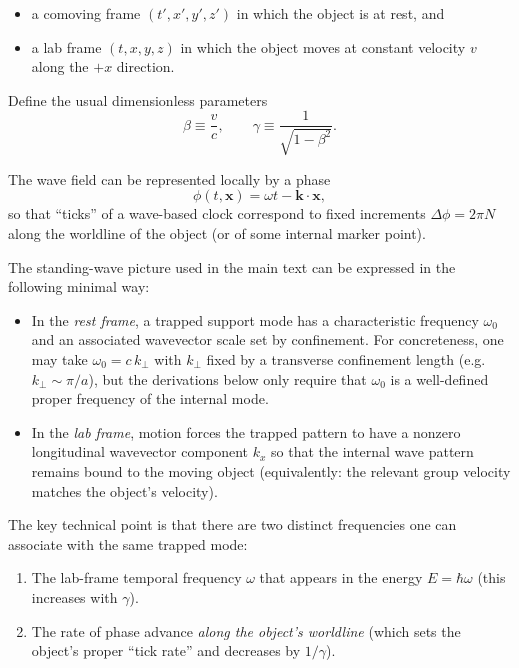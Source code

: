 \documentclass[11pt]{article}
\begin{document}
\begin{itemize}
  \item a comoving frame $(t',x',y',z')$ in which the object is at rest, and
  \item a lab frame $(t,x,y,z)$ in which the object moves at constant velocity
    $v$ along the $+x$ direction.
\end{itemize}

Define the usual dimensionless parameters
\begin{equation}
\beta \equiv \frac{v}{c},
\qquad
\gamma \equiv \frac{1}{\sqrt{1-\beta^2}}.
\label{eq:app_beta_gamma}
\end{equation}

The wave field can be represented locally by a phase
\begin{equation}
\phi(t,\mathbf x) = \omega t - \mathbf k\cdot \mathbf x,
\label{eq:app_phase_def}
\end{equation}
so that ``ticks'' of a wave-based clock correspond to fixed increments
$\Delta\phi = 2\pi N$ along the worldline of the object (or of some internal
marker point).

The standing-wave picture used in the main text can be expressed in the
following minimal way:

\begin{itemize}
\item In the \emph{rest frame}, a trapped support mode has a characteristic
frequency $\omega_0$ and an associated wavevector scale set by confinement.
For concreteness, one may take $\omega_0 = c\,k_\perp$ with $k_\perp$ fixed by a
transverse confinement length (e.g.\ $k_\perp\sim \pi/a$), but the derivations
below only require that $\omega_0$ is a well-defined proper frequency of the
internal mode.
\item In the \emph{lab frame}, motion forces the trapped pattern to have a
nonzero longitudinal wavevector component $k_x$ so that the internal wave
pattern remains bound to the moving object (equivalently: the relevant group
velocity matches the object's velocity).
\end{itemize}

The key technical point is that there are two distinct frequencies one can
associate with the same trapped mode:

\begin{enumerate}
\item The lab-frame temporal frequency $\omega$ that appears in the energy
$E=\hbar\omega$ (this increases with $\gamma$).
\item The rate of phase advance \emph{along the object's worldline}
(which sets the object's proper ``tick rate'' and decreases by $1/\gamma$).
\end{enumerate}
\end{document}
